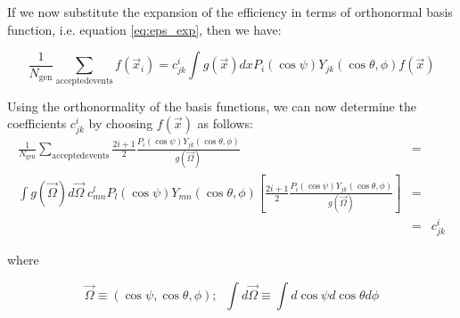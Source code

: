 \documentclass[a4paper,9pt,twoside]{article}
\begin{document}
If we now substitute the expansion of the efficiency in terms of orthonormal basis function,
i.e. equation \ref{eq:eps_exp}, then we have:

\begin{equation}
  \frac{1}{N_{\mathrm{gen}}} \sum_{\mathrm{accepted events}} f(\vec{x}_i) = c^i_{jk}  \int g(\vec{x})dx P_i(\cos\psi)Y_{jk}(\cos\theta,\phi)  f(\vec{x})
\end{equation}

Using the orthonormality of the basis functions, we can now determine the coefficients $c^i_{jk}$ 
by  choosing $f(\vec{x})$ as follows:
\begin{eqnarray}
\frac{1}{N_{\mathrm{gen}}} \sum_{\mathrm{accepted events}} \frac{2i+1}{2}\frac{ P_i(\cos\psi)Y_{jk}(\cos\theta,\phi) }{ g(\vec{\Omega}) }  &=&\\
    \int g(\vec{\Omega})d\vec{\Omega}\; c^l_{mn} P_l(\cos\psi)Y_{mn}(\cos\theta,\phi) \left[  \frac{2i+1}{2}\frac{ P_i(\cos\psi)Y_{jk}(\cos\theta,\phi) }{ g(\vec{\Omega}) } \right] &=&\\
    &=& c^i_{jk}
\end{eqnarray}

where

\begin{equation}
\vec{\Omega} \equiv (\cos\psi,\cos\theta,\phi);\;\; \int d\vec{\Omega} \equiv \int d\cos\psi d\cos\theta d\phi
\end{equation}
\end{document}
